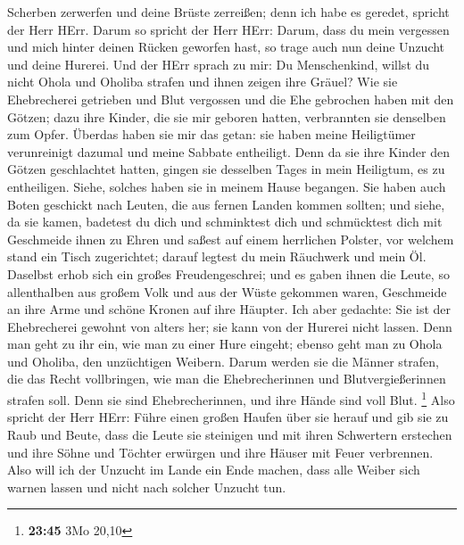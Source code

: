 Scherben zerwerfen und deine Brüste zerreißen; denn ich habe es geredet,
spricht der Herr HErr.  Darum so spricht der Herr HErr:
Darum, dass du mein vergessen und mich hinter deinen Rücken geworfen
hast, so trage auch nun deine Unzucht und deine Hurerei. 
Und der HErr sprach zu mir: Du Menschenkind, willst du nicht Ohola und
Oholiba strafen und ihnen zeigen ihre Gräuel?  Wie sie
Ehebrecherei getrieben und Blut vergossen und die Ehe gebrochen haben
mit den Götzen; dazu ihre Kinder, die sie mir geboren hatten,
verbrannten sie denselben zum Opfer.  Überdas haben sie mir
das getan: sie haben meine Heiligtümer verunreinigt dazumal und meine
Sabbate entheiligt.  Denn da sie ihre Kinder den Götzen
geschlachtet hatten, gingen sie desselben Tages in mein Heiligtum, es zu
entheiligen. Siehe, solches haben sie in meinem Hause begangen.
 Sie haben auch Boten geschickt nach Leuten, die aus fernen
Landen kommen sollten; und siehe, da sie kamen, badetest du dich und
schminktest dich und schmücktest dich mit Geschmeide ihnen zu Ehren
 und saßest auf einem herrlichen Polster, vor welchem stand
ein Tisch zugerichtet; darauf legtest du mein Räuchwerk und mein Öl.
 Daselbst erhob sich ein großes Freudengeschrei; und es
gaben ihnen die Leute, so allenthalben aus großem Volk und aus der Wüste
gekommen waren, Geschmeide an ihre Arme und schöne Kronen auf ihre
Häupter.  Ich aber gedachte: Sie ist der Ehebrecherei
gewohnt von alters her; sie kann von der Hurerei nicht lassen.
 Denn man geht zu ihr ein, wie man zu einer Hure eingeht;
ebenso geht man zu Ohola und Oholiba, den unzüchtigen Weibern.
 Darum werden sie die Männer strafen, die das Recht
vollbringen, wie man die Ehebrecherinnen und Blutvergießerinnen strafen
soll. Denn sie sind Ehebrecherinnen, und ihre Hände sind voll Blut.
\footnote{\textbf{23:45} 3Mo 20,10}  Also spricht der Herr
HErr: Führe einen großen Haufen über sie herauf und gib sie zu Raub und
Beute,  dass die Leute sie steinigen und mit ihren
Schwertern erstechen und ihre Söhne und Töchter erwürgen und ihre Häuser
mit Feuer verbrennen.  Also will ich der Unzucht im Lande
ein Ende machen, dass alle Weiber sich warnen lassen und nicht nach
solcher Unzucht tun.


